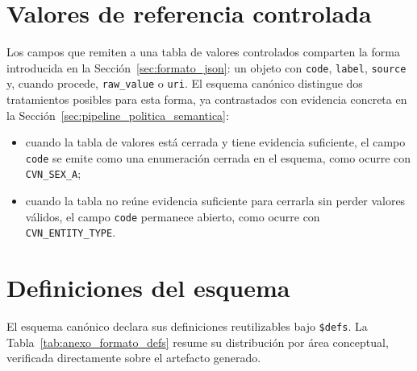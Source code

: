 \section{Valores de referencia controlada}
\label{sec:anexo_formato_valores}

Los campos que remiten a una tabla de valores controlados comparten la
forma introducida en la Sección~\ref{sec:formato_json}: un objeto con
\texttt{code}, \texttt{label}, \texttt{source} y, cuando procede,
\texttt{raw\_value} o \texttt{uri}. El esquema canónico distingue dos
tratamientos posibles para esta forma, ya contrastados con evidencia
concreta en la Sección~\ref{sec:pipeline_politica_semantica}:

\begin{itemize}
  \item cuando la tabla de valores está cerrada y tiene evidencia
  suficiente, el campo \texttt{code} se emite como una enumeración cerrada
  en el esquema, como ocurre con \texttt{CVN\_SEX\_A};

  \item cuando la tabla no reúne evidencia suficiente para cerrarla sin
  perder valores válidos, el campo \texttt{code} permanece abierto, como
  ocurre con \texttt{CVN\_ENTITY\_TYPE}.
\end{itemize}

\section{Definiciones del esquema}
\label{sec:anexo_formato_definiciones}

El esquema canónico declara sus definiciones reutilizables bajo
\texttt{\$defs}. La Tabla~\ref{tab:anexo_formato_defs} resume su
distribución por área conceptual, verificada directamente sobre el
artefacto generado.

